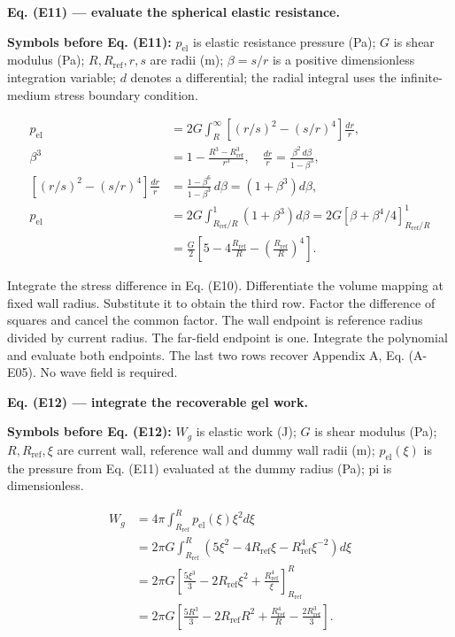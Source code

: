 \documentclass[11pt]{article}
\begin{document}
\textbf{Eq. (E11) — evaluate the spherical elastic resistance.}


\textbf{Symbols before Eq. (E11):} \(p_{\mathrm{el}}\) is elastic resistance pressure (Pa); \(G\) is shear modulus (Pa); \(R,R_{\mathrm{ref}},r,s\) are radii (m); \(\beta=s/r\) is a positive dimensionless integration variable; \(d\) denotes a differential; the radial integral uses the infinite-medium stress boundary condition.



\begin{equation*}
\begin{aligned}
p_{\mathrm{el}}&=2G\int_R^\infty[(r/s)^2-(s/r)^4]\frac{dr}{r},\\
\beta^3&=1-\frac{R^3-R_{\mathrm{ref}}^3}{r^3},\quad
\frac{dr}{r}=\frac{\beta^2\,d\beta}{1-\beta^3},\\
[(r/s)^2-(s/r)^4]\frac{dr}{r}
&=\frac{1-\beta^6}{1-\beta^3}\,d\beta=(1+\beta^3)d\beta,\\
p_{\mathrm{el}}&=2G\int_{R_{\mathrm{ref}}/R}^{1}(1+\beta^3)d\beta
=2G[\beta+\beta^4/4]_{R_{\mathrm{ref}}/R}^{1}\\
&=\frac G2\left[5-4\frac{R_{\mathrm{ref}}}{R}-\left(\frac{R_{\mathrm{ref}}}{R}\right)^4\right].
\end{aligned}
\end{equation*}

Integrate the stress difference in Eq. (E10). Differentiate the volume mapping at fixed wall radius. Substitute it to obtain the third row. Factor the difference of squares and cancel the common factor. The wall endpoint is reference radius divided by current radius. The far-field endpoint is one. Integrate the polynomial and evaluate both endpoints. The last two rows recover Appendix A, Eq. (A-E05). No wave field is required.


\textbf{Eq. (E12) — integrate the recoverable gel work.}


\textbf{Symbols before Eq. (E12):} \(W_g\) is elastic work (J); \(G\) is shear modulus (Pa); \(R,R_{\mathrm{ref}},\xi\) are current wall, reference wall and dummy wall radii (m); \(p_{\mathrm{el}}(\xi)\) is the pressure from Eq. (E11) evaluated at the dummy radius (Pa); pi is dimensionless.



\begin{equation*}
\begin{aligned}
W_g&=4\pi\int_{R_{\mathrm{ref}}}^{R}p_{\mathrm{el}}(\xi)\xi^2d\xi\\
&=2\pi G\int_{R_{\mathrm{ref}}}^{R}
(5\xi^2-4R_{\mathrm{ref}}\xi-R_{\mathrm{ref}}^4\xi^{-2})d\xi\\
&=2\pi G\left[\frac{5\xi^3}{3}-2R_{\mathrm{ref}}\xi^2+\frac{R_{\mathrm{ref}}^4}{\xi}\right]_{R_{\mathrm{ref}}}^{R}\\
&=2\pi G\left[\frac{5R^3}{3}-2R_{\mathrm{ref}}R^2+\frac{R_{\mathrm{ref}}^4}{R}-\frac{2R_{\mathrm{ref}}^3}{3}\right].
\end{aligned}
\end{equation*}
\end{document}
